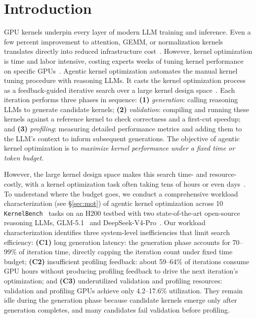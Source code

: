 \section{Introduction}
\label{sec:intro}

GPU kernels underpin every layer of modern LLM training and inference.
Even a few percent improvement to attention, GEMM, or normalization kernels translates directly into reduced infrastructure cost~\cite{kevin32b,cudaagent,cudaforge}.
However, kernel optimization is time and labor intensive, costing experts weeks of tuning kernel performance on specific GPUs~\cite{flashattention1,flashattention2,flashattention3}.
Agentic kernel optimization automates the manual kernel tuning procedure with reasoning LLMs. 
It casts the kernel optimization process as a feedback-guided iterative search over a large kernel design space~\cite{K-Search,Kernel-Smith,AlphaEvolve,cudaforge}.
Each iteration performs three phases in sequence:
\textbf{(1)} \emph{generation}: calling reasoning LLMs to generate candidate kernels;
\textbf{(2)} \emph{validation}: compiling and running these kernels against a reference kernel to check correctness and a first-cut speedup;
and \textbf{(3)} \emph{profiling}: measuring detailed performance metrics and adding them to the LLM's context to inform subsequent generations.
The objective of agentic kernel optimization is to \emph{maximize kernel performance under a fixed time or token budget}.

However, the large kernel design space makes this search time- and resource-costly, with
a kernel optimization task often taking tens of hours or even days~\cite{cudaforge,AlphaEvolve,kernelagent2025}.
To understand where the budget goes, we conduct a comprehensive workload characterization (see \S\ref{sec:mot}) of agentic kernel optimization across
10 \texttt{KernelBench}~\cite{kernelbench} tasks on an H200 testbed with two state-of-the-art open-source reasoning LLMs, 
GLM-5.1~\cite{glm5} and DeepSeek-V4-Pro~\cite{deepseekv4}.
Our workload characterization identifies three system-level inefficiencies that limit search efficiency: 
\textbf{(C1)} long generation latency: the generation phase accounts for 70--99\% of iteration time, directly capping the iteration count under fixed time budget;
\textbf{(C2)} insufficient profiling feedback: about 59--64\% of iterations consume GPU hours without producing profiling feedback to drive the next iteration's optimization; 
and \textbf{(C3)} underutilized validation and profiling resources: validation
and profiling GPUs achieve only 4.2--17.6\% utilization.
They remain idle during the generation phase because candidate kernels emerge
only after generation completes, and many candidates fail validation before profiling.

